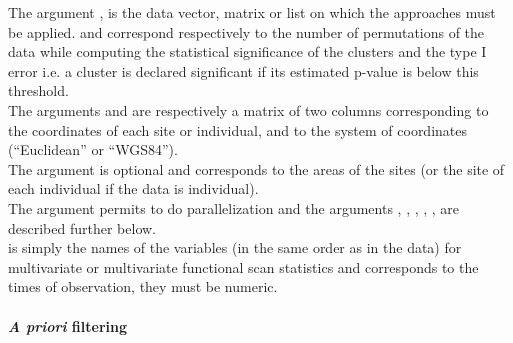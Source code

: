 \noindent The argument , is the data vector, matrix or list on which the approaches must be applied.  and  correspond respectively to the number of permutations of the data while computing the statistical significance of the clusters and the type I error i.e. a cluster is declared significant if its estimated p-value is below this threshold.  \\
The arguments  and  are respectively a matrix of two columns corresponding to the coordinates of each site or individual, and to the system of coordinates (``Euclidean'' or ``WGS84''). \\
The  argument is optional and corresponds to the areas of the sites (or the site of each individual if the data is individual). \\
The argument  permits to do parallelization and the arguments , , , , ,  are described further below. \\
 is simply the names of the variables (in the same order as in the data) for multivariate or multivariate functional scan statistics and  corresponds to the times of observation, they must be numeric.

\paragraph{\textit{A priori} filtering}

